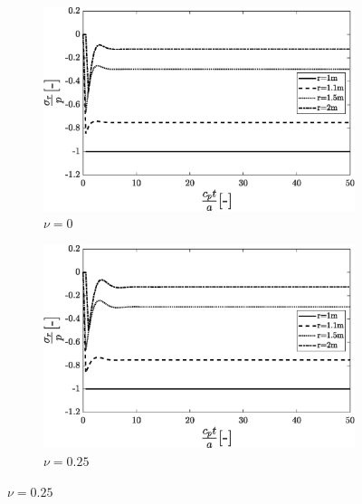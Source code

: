 \documentclass{article}
\begin{document}
\begin{figure}[!]
    \centering
        \begin{subfigure}{0.64\textwidth}
            \includegraphics[width=1\linewidth]{figures/v0.eps} 
            \caption{$\nu = 0$}
            \label{fig:v0}
        \end{subfigure}
        
        \begin{subfigure}{0.64\textwidth}
            \includegraphics[width=1\linewidth]{figures/v0_25.eps} 
            \caption{$\nu = 0.25$}
            \label{fig:v0.25}
        \end{subfigure}
        

\end{figure}
\end{document}
